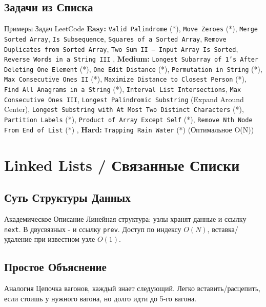 \subsection{Задачи из Списка}
\begin{myblock}{Примеры Задач LeetCode}
    \textbf{Easy:} \texttt{Valid Palindrome} (*), \texttt{Move Zeroes} (*), \texttt{Merge Sorted Array}, \texttt{Is Subsequence}, \texttt{Squares of a Sorted Array}, \texttt{Remove Duplicates from Sorted Array}, \texttt{Two Sum II – Input Array Is Sorted}, \texttt{Reverse Words in a String III} \sep
    \textbf{Medium:} \texttt{Longest Subarray of 1’s After Deleting One Element} (*), \texttt{One Edit Distance} (*), \texttt{Permutation in String} (*), \texttt{Max Consecutive Ones II} (*), \texttt{Maximize Distance to Closest Person} (*), \texttt{Find All Anagrams in a String} (*), \texttt{Interval List Intersections}, \texttt{Max Consecutive Ones III}, \texttt{Longest Palindromic Substring} (Expand Around Center), \texttt{Longest Substring with At Most Two Distinct Characters} (*), \texttt{Partition Labels} (*), \texttt{Product of Array Except Self} (*), \texttt{Remove Nth Node From End of List} (*) \sep
    \textbf{Hard:} \texttt{Trapping Rain Water} (*) (Оптимальное O(N))
\end{myblock}

\section{Linked Lists / Связанные Списки}

\subsection{Суть Структуры Данных}
\begin{myblock}{Академическое Описание}
    Линейная структура: узлы хранят данные и ссылку \texttt{next}. В двусвязных - и ссылку \texttt{prev}. Доступ по индексу $O(N)$, вставка/удаление при известном узле $O(1)$.
\end{myblock}

\subsection{Простое Объяснение}
\begin{myblock}{Аналогия}
    Цепочка вагонов, каждый знает следующий. Легко вставить/расцепить, если стоишь у нужного вагона, но долго идти до 5-го вагона.
\end{myblock}

